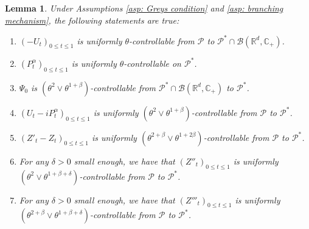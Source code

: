 \documentclass[12pt,a4paper]{amsart}
\theoremstyle{plain}
\newtheorem{lem}[thm]{Lemma}
\theoremstyle{definition}
\numberwithin{equation}{section}
\begin{document}
\begin{lem}
  \label{lem: upper bound for usgx}
  Under Assumptions \ref{asp: Greys condition} and \ref{asp: branching mechanism}, the following statements are true:
  \begin{enumerate}
  \item
    $(-U_t)_{0\leq t\leq 1}$ is uniformly $\theta$-controllable from $\mathcal P$ to $\mathcal P^*\cap \mathcal B(\mathbb R^d, \mathbb C_+)$.
  \item
    $(P^\alpha_t)_{0\leq t\leq 1}$ is uniformly $\theta$-controllable on $\mathcal P^*$.
  \item
    $\Psi_0$ is $(\theta^2\vee \theta^{1+\beta})$-controllable from $\mathcal P^* \cap \mathcal B(\mathbb R^d, \mathbb C_+)$ to $\mathcal P^*$.
  \item
    $(U_t- iP_t^{\alpha})_{0\leq t\leq 1}$ is uniformly $(\theta^2\vee \theta^{1+\beta})$-controllable from $\mathcal P$ to $\mathcal P^*$.
  \item
    $(Z'_t-Z_t)_{0\leq t\leq 1}$ is uniformly $(\theta^{2+\beta}\vee \theta^{1+2\beta})$-controllable from $\mathcal P$ to $\mathcal P^*$.
  \item
    For any $\delta > 0$ small enough, we have that $(Z''_t)_{0\leq t\leq 1}$ is uniformly $(\theta^2\vee \theta^{1+\beta+\delta})$-controllable from $\mathcal P$ to $\mathcal P^*$.
  \item
    For any $\delta > 0$ small enough, we have that $(Z'''_t)_{0\leq t\leq 1}$ is uniformly $(\theta^{2+\beta}\vee \theta^{1+\beta+\delta})$-controllable from $\mathcal P$ to $\mathcal P^*$.
  \end{enumerate}
\end{lem}
\end{document}
